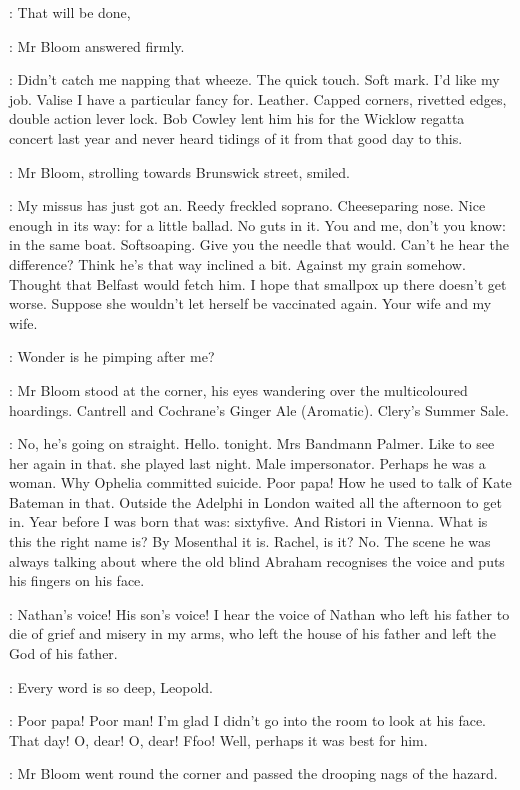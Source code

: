 \Bloom:
That will be done,

:
Mr Bloom answered firmly.

\BloomInt:
Didn't catch me napping that wheeze.
The quick touch.
Soft mark.
I'd like my job.
Valise I have a particular fancy for.
Leather.
Capped corners,
rivetted edges,
double action lever lock.
Bob Cowley lent him his for the Wicklow regatta concert last year
and never heard tidings of it from that good day to this.

:
Mr Bloom, strolling towards Brunswick street, smiled.

\BloomInt:
My missus has just got an.
Reedy freckled soprano.
Cheeseparing nose.
Nice enough in its way: for a little ballad.
No guts in it.
You and me, don't you know:
in the same boat.
Softsoaping.
Give you the needle that would.
Can't he hear the difference?
Think he's that way inclined a bit.
Against my grain somehow.
Thought that Belfast would fetch him.
I hope that smallpox up there doesn't get worse.
Suppose she wouldn't let herself be vaccinated again.
Your wife and my wife.

\BloomInt:
Wonder is he pimping after me?

:
Mr Bloom stood at the corner,
his eyes wandering over the multicoloured hoardings.
Cantrell and Cochrane's Ginger Ale (Aromatic).
Clery's Summer Sale.

\BloomInt:
No, he's going on straight.
Hello.
 tonight.
Mrs Bandmann Palmer.
Like to see her again in that.
 she played last night.
Male impersonator.
Perhaps he was a woman.
Why Ophelia committed suicide.
Poor papa!
How he used to talk of Kate Bateman in that.
Outside the Adelphi in London
waited all the afternoon to get in.
Year before I was born
that was:
sixtyfive.
And Ristori in Vienna.
What is this the right name is?
By Mosenthal it is.
Rachel, is it?
No.
The scene he was always talking about
where the old blind Abraham recognises the voice
and puts his fingers on his face.

\BloomInt:
Nathan's voice!
His son's voice!
I hear the voice of Nathan who left his father
to die of grief and misery in my arms,
who left the house of his father
and left the God of his father.

\BloomInt:
Every word is so deep, Leopold.

\BloomInt:
Poor papa!
Poor man!
I'm glad I didn't go into the room to look at his face.
That day!
O, dear!
O, dear!
Ffoo!
Well, perhaps it was best for him.

:
Mr Bloom went round the corner
and passed the drooping nags of the hazard.

